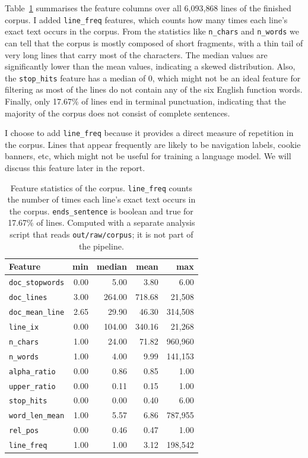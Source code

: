 \documentclass[10pt]{article}
\begin{document}
Table~\ref{tab:features} summarises the feature columns over all
6{,}093{,}868 lines of the finished corpus. I added \texttt{line\_freq} features,
which counts how many times each line's exact text occurs in the corpus.
From the statistics like \texttt{n\_chars} and \texttt{n\_words} we can tell 
that the corpus is mostly composed of short fragments, with a thin tail of 
very long lines that carry most of the characters. The median values are significantly 
lower than the mean values, indicating a skewed distribution. Also, the \texttt{stop\_hits} 
feature has a median of 0, which might not be an ideal feature for filtering as most of the lines
do not contain any of the six English function words. Finally, only 17.67\% of lines end 
in terminal punctuation, indicating that the majority of the corpus does not consist of complete sentences.

I choose to add \texttt{line\_freq} because it provides a direct measure of repetition in the corpus.
Lines that appear frequently are likely to be navigation labels, cookie banners, etc,
which might not be useful for training a language model. We will discuss this feature later in the report.


\begin{table}[htbp]
\caption{Feature statistics of the corpus. \texttt{line\_freq} counts the number of times each line's exact text occurs in the corpus. \texttt{ends\_sentence} is boolean and true for
17.67\% of lines. Computed with a separate analysis script that reads
\texttt{out/raw/corpus}; it is not part of the pipeline.}
\label{tab:features}
\centering
\begin{tabular}{lrrrr}
\toprule
Feature & min & median & mean & max \\
\midrule
\texttt{doc\_stopwords} & 0.00 & 5.00 & 3.80 & 6.00 \\
\texttt{doc\_lines}     & 3.00 & 264.00 & 718.68 & 21{,}508 \\
\texttt{doc\_mean\_line} & 2.65 & 29.90 & 46.30 & 314{,}508 \\
\texttt{line\_ix}       & 0.00 & 104.00 & 340.16 & 21{,}268 \\
\texttt{n\_chars}       & 1.00 & 24.00 & 71.82 & 960{,}960 \\
\texttt{n\_words}       & 1.00 & 4.00 & 9.99 & 141{,}153 \\
\texttt{alpha\_ratio}   & 0.00 & 0.86 & 0.85 & 1.00 \\
\texttt{upper\_ratio}   & 0.00 & 0.11 & 0.15 & 1.00 \\
\texttt{stop\_hits}     & 0.00 & 0.00 & 0.40 & 6.00 \\
\texttt{word\_len\_mean} & 1.00 & 5.57 & 6.86 & 787{,}955 \\
\texttt{rel\_pos}       & 0.00 & 0.46 & 0.47 & 1.00 \\
\texttt{line\_freq}     & 1.00 & 1.00 & 3.12 & 198{,}542 \\
\bottomrule
\end{tabular}
\end{table}
\end{document}
